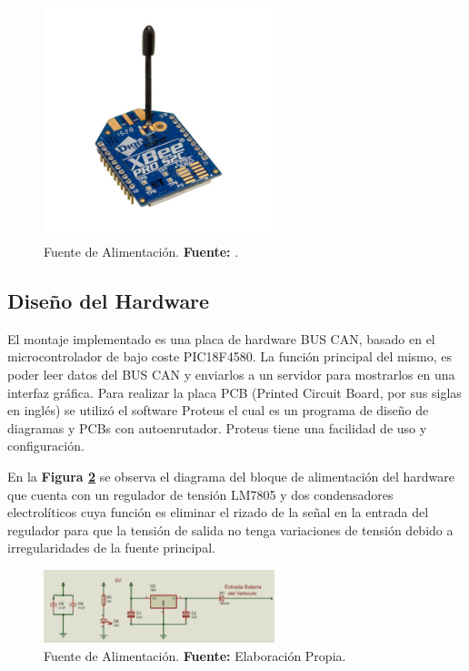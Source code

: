 \begin{figure}[H]
	\centering
		\includegraphics[width=0.6\textwidth]{./Cap4imagen/xbee_modulo.jpg}
	\caption[Fuente de Alimentación.]{Fuente de Alimentación.\textbf{ Fuente:}  \cite{cite_xbee_4}.}
	\label{fig_xbee_4} %
\end{figure}


\subsection{Diseño del Hardware}
El montaje implementado es una placa de hardware BUS CAN, basado en el microcontrolador de bajo coste PIC18F4580. La función principal del mismo, es poder leer datos del BUS
CAN y enviarlos a un servidor para mostrarlos en una interfaz gráfica. Para realizar la placa PCB (Printed Circuit Board, por sus siglas en inglés) se utilizó el software Proteus el cual es un programa de diseño de diagramas y PCBs con autoenrutador. Proteus tiene una facilidad de uso y configuración.

En la \textbf{Figura \ref{Esch1}} se observa el diagrama del bloque de alimentación del hardware que cuenta con un regulador de tensión LM7805 y dos condensadores electrolíticos cuya función es eliminar el rizado de la señal en la entrada del regulador para que la tensión de salida no tenga variaciones de tensión debido a irregularidades de la fuente principal. 

\begin{figure}[H]
	\centering
		\includegraphics[width=0.6\textwidth]{./Cap4imagen/Fuente5v_4.png}
	\caption[Fuente de Alimentación.]{Fuente de Alimentación.\textbf{ Fuente:} 
	Elaboración Propia.}
	\label{Esch1} %
\end{figure}

